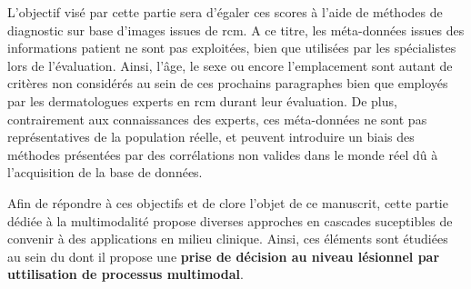 L'objectif visé par cette partie sera d'égaler ces scores à l'aide de méthodes de diagnostic sur base d'images issues de \gls{rcm}. A ce titre, les méta-données issues des informations patient ne sont pas exploitées, bien que utilisées par les spécialistes lors de l'évaluation. Ainsi, l'âge, le sexe ou encore l'emplacement sont autant de critères non considérés au sein de ces prochains paragraphes bien que employés par les dermatologues experts en \gls{rcm} durant leur évaluation. De plus, contrairement aux connaissances des experts, ces méta-données ne sont pas représentatives de la population réelle, et peuvent introduire un biais des méthodes présentées par des corrélations non valides dans le monde réel dû à l'acquisition de la base de données.\par


Afin de répondre à ces objectifs et de clore l'objet de ce manuscrit, cette partie dédiée à la multimodalité propose diverses approches en cascades suceptibles de convenir à des applications en milieu clinique. Ainsi, ces éléments sont étudiées au sein du  dont il propose une \textbf{prise de décision au niveau lésionnel par uttilisation de processus multimodal}.\par